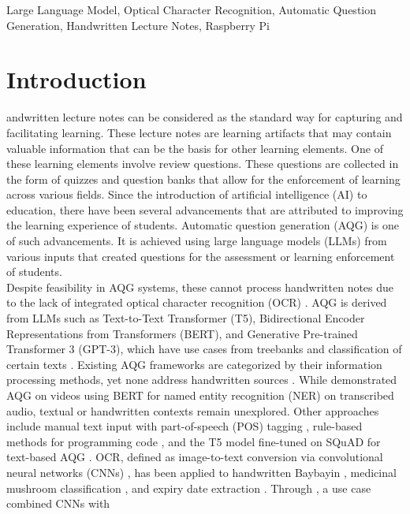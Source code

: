 \documentclass[conference]{IEEEtran}
\begin{document}
\begin{IEEEkeywords}
\indent Large Language Model, Optical Character Recognition,
Automatic Question Generation, Handwritten Lecture Notes, Raspberry Pi
\end{IEEEkeywords}

\section{Introduction}
andwritten lecture notes can be considered as the standard way 
for capturing and facilitating learning. These lecture notes are 
learning artifacts that may contain valuable information that can 
be the basis for other learning elements. One of these learning elements 
involve review questions. These questions are collected in the 
form of quizzes and question banks that allow for the enforcement of 
learning across various fields. Since the introduction of artificial 
intelligence (AI) to education, there have been several advancements 
that are attributed to improving the learning experience of students. 
Automatic question generation (AQG) is one of such advancements. 
It is achieved using large language models (LLMs) from various inputs 
that created questions for the assessment or learning enforcement of 
students.
\\
\indent Despite feasibility in AQG systems, 
these cannot process handwritten notes 
due to the lack of integrated optical character recognition (OCR) 
\cite{Arbaaeen2020}. AQG is derived from LLMs 
such as Text-to-Text Transformer (T5), Bidirectional Encoder Representations from Transformers 
(BERT), and Generative Pre-trained Transformer 3 (GPT-3), which have use cases from 
treebanks \cite{Mesina2020} and classification of certain texts \cite{Padilla2020} \cite{Mingua2021} \cite{Fernandez2023}.
Existing AQG frameworks are categorized by 
their information processing methods, yet none address 
handwritten sources \cite{Arbaaeen2020}. While \cite{Ou2022} demonstrated AQG 
on videos using BERT for named entity recognition (NER) on 
transcribed audio, textual or handwritten contexts remain 
unexplored. Other approaches include manual text input 
with part-of-speech (POS) tagging \cite{Moron2021}, rule-based methods 
for programming code \cite{Gaur2023}, and the T5 model 
fine-tuned on SQuAD for text-based AQG \cite{Tsai2021}. OCR, defined as 
image-to-text conversion via convolutional neural networks (CNNs) \cite{Ligsay2022}, has been applied to handwritten Baybayin \cite{Ligsay2022}, medicinal mushroom classification \cite{Sutayco2024}, and expiry date extraction \cite{Manlises2024}. Through \cite{Calimag2023}, a use case combined CNNs with 
\end{document}
